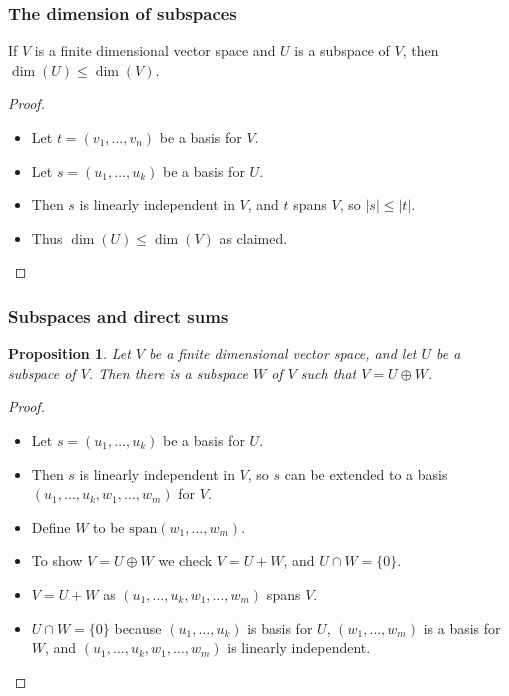 \documentclass[handout]{beamer}
\newtheorem{proposition}[theorem]{Proposition}
\newcommand{\spa}{\mathrm{span}}
\begin{document}
\begin{frame}
\frametitle{The dimension of subspaces}
\begin{corollary}
If $V$ is a finite dimensional vector space and $U$ is a subspace of $V$, then $\dim(U)\leq \dim(V)$.
\end{corollary}
\begin{proof}
\begin{itemize}
\item Let $t= (v_1,\ldots,v_n)$ be a basis for $V$.
\vspace{0.5cm}
\item Let $s= (u_1,\ldots,u_k)$ be a basis for $U$. 
\vspace{0.5cm}
\item Then $s$ is linearly independent in $V$, and $t$ spans $V$, so $|s|\leq |t|$. 
\vspace{0.5cm}
\item Thus $\dim(U)\leq \dim(V)$ as claimed.
\end{itemize}
\end{proof}
\end{frame}

\begin{frame}
\frametitle{Subspaces and direct sums}
\begin{proposition}
Let $V$ be a finite dimensional vector space, and let $U$ be a subspace of $V$. Then there is a subspace $W$ of $V$ such that $V=U\oplus W$.
\end{proposition}
\begin{proof}
\begin{itemize}
\item Let $s=(u_1,\ldots,u_k)$ be a basis for $U$. 
\item Then $s$ is linearly independent in $V$, so $s$ can be extended to a basis $(u_1,\ldots,u_k,w_1,\ldots,w_m)$ for $V$. 
\item Define $W$ to be $\spa(w_1,\ldots,w_m)$.
\item To show $V = U\oplus W$ we check $V = U + W$, and $U\cap W =\{0\}$. 
\item $V = U + W$ as $(u_1,\ldots,u_k,w_1,\ldots,w_m)$ spans $V$. 
\item $U\cap W =\{0\}$ because $(u_1,\ldots,u_k)$ is basis for $U$, $(w_1,\ldots,w_m)$ is a basis for $W$, and $(u_1,\ldots,u_k,w_1,\ldots,w_m)$ is linearly independent. 
\end{itemize}  
\end{proof}
\end{frame}
\end{document}

